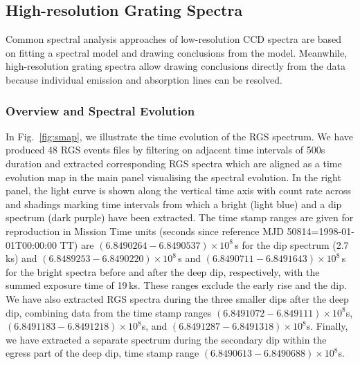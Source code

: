 \documentclass{aa}
\begin{document}
\subsection{High-resolution Grating Spectra}
\label{sect:descr:grating}

Common spectral analysis approaches of low-resolution CCD spectra are based
on fitting a spectral model and drawing conclusions from the model.
Meanwhile, high-resolution grating spectra allow drawing conclusions directly
from the data because individual emission and absorption lines can be resolved.\\

\subsubsection{Overview and Spectral Evolution}
\label{sect:descr:smap}

In Fig.~\ref{fig:smap}, we illustrate
the time evolution of the RGS spectrum. We have produced 48 RGS events files
by filtering on adjacent time intervals of 500s duration and extracted
corresponding RGS spectra which are aligned as a time evolution map in the
main panel visualising the spectral evolution. In the
right panel, the light curve is shown along the vertical time axis with
count rate across and shadings marking time intervals from which a
bright (light blue) and a dip spectrum (dark purple) have been extracted.
The time stamp ranges are given for reproduction in Mission Time units
(seconds since reference MJD
50814=1998-01-01T00:00:00 TT) are $(6.8490264-6.8490537)\times 10^8$\,s for the
dip spectrum (2.7\,ks) and $(6.8489253-6.8490220)\times 10^8$\,s and
$(6.8490711-6.8491643)\times 10^8$\,s for the bright spectra before
and after the deep dip, respectively, with the summed exposure time of
19\,ks. These ranges exclude the early rise and the dip. We have also extracted
RGS spectra during the three smaller dips after the deep dip, combining
data from the time stamp ranges $(6.8491072-6.849111)\times 10^8$s,
$(6.8491183-6.8491218)\times 10^8$s, and
$(6.8491287-6.8491318)\times 10^8$s. Finally, we have extracted a separate
spectrum during the secondary dip within the egress part of the
deep dip, time stamp range $(6.8490613-6.8490688)\times 10^8$s.
\end{document}
